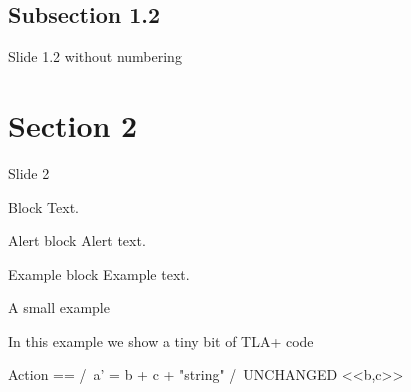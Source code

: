 \documentclass{beamer}
\begin{document}
    \subsection{Subsection 1.2}
    \begin{frame}[nonumber]{Slide 1.2 without numbering}
        \lipsum[2]
    \end{frame}
    
    \section{Section 2}
    \begin{frame}{Slide 2}
        \begin{block}{Block}
            Text.
        \end{block}
        \pause
        \begin{alertblock}{Alert block}
            Alert \alert{text}.
        \end{alertblock}
        \pause
        \begin{exampleblock}{Example block}
            Example \textcolor{greenPolimi}{text}.
        \end{exampleblock}
    \end{frame}

    \begin{frame}[fragile]{A small example}
        \begin{minipage}{\textwidth}
            In this example we show a tiny bit of TLA+ code
            \begin{tla}
                Action == /\ a' = b + c + "string"
                          /\ UNCHANGED <<b,c>>
            \end{tla}
            \begin{tlatex}
            \end{tlatex}
        \end{minipage}
    \end{frame}

    

    

    
\end{document}
